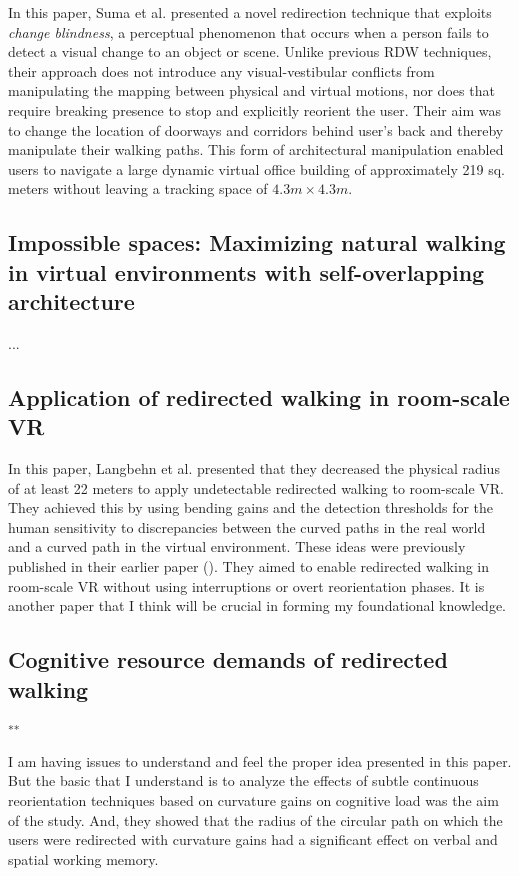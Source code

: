 \documentclass[12pt]{article}
\begin{document}
In this paper, Suma et al. presented a novel redirection technique that exploits \emph{change blindness}, a perceptual phenomenon that occurs when a person fails to detect a visual change to an object or scene. Unlike previous RDW techniques, their approach does not introduce any visual-vestibular conflicts from manipulating the mapping between physical and virtual motions, nor does that require breaking presence to stop and explicitly reorient the user. Their aim was to change the location of doorways and corridors behind user's back and thereby manipulate their walking paths. This form of architectural manipulation enabled users to navigate a large dynamic virtual office building of approximately 219 sq. meters without leaving a tracking space of $4.3m \times 4.3m$.

\subsection{Impossible spaces: Maximizing natural walking in virtual environments with self-overlapping architecture}
\textbf{\cite{suma2012impossible}}

...

\subsection{Application of redirected walking in room-scale VR}
\textbf{\cite{langbehn2017application}}

In this paper, Langbehn et al. presented that they decreased the physical radius of at least 22 meters to apply undetectable redirected walking to room-scale VR. They achieved this by using bending gains and the detection thresholds for the human sensitivity to discrepancies between the curved paths in the real world and a curved path in the virtual environment. These ideas were previously published in their earlier paper (\cite{langbehn2017bending}). They aimed to enable redirected walking in room-scale VR without using interruptions or overt reorientation phases. It is another paper that I think will be crucial in forming my foundational knowledge.

\subsection{Cognitive resource demands of redirected walking}
\textbf{\cite{bruder2015cognitive}}\textsuperscript{**}

I am having issues to understand and feel the proper idea presented in this paper. But the basic that I understand is to analyze the effects of subtle continuous reorientation techniques based on curvature gains on cognitive load was the aim of the study. And, they showed that the radius of the circular path on which the users were redirected with curvature gains had a significant effect on verbal and spatial working memory.
\end{document}
